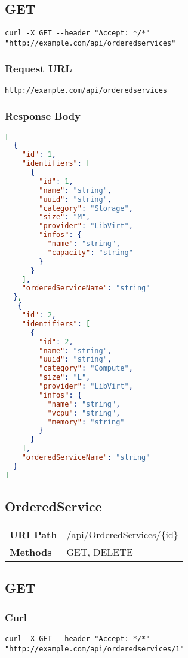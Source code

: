 \subsection{GET}
\begin{lstlisting}[style=Bash] 
curl -X GET --header "Accept: */*" "http://example.com/api/orderedservices"
\end{lstlisting}

\subsubsection{Request URL}
\begin{lstlisting}[] 
http://example.com/api/orderedservices
\end{lstlisting}

\subsubsection{Response Body}
\begin{lstlisting}[language=json] 
[
  {
    "id": 1,
    "identifiers": [
      {
        "id": 1,
        "name": "string",
        "uuid": "string",
        "category": "Storage",
        "size": "M",
        "provider": "LibVirt",
        "infos": {
          "name": "string",
          "capacity": "string"
        }
      }
    ],
    "orderedServiceName": "string"
  },
   {
    "id": 2,
    "identifiers": [
      {
        "id": 2,
        "name": "string",
        "uuid": "string",
        "category": "Compute",
        "size": "L",
        "provider": "LibVirt",
        "infos": {
          "name": "string",
          "vcpu": "string",
          "memory": "string"
        }
      }
    ],
    "orderedServiceName": "string"
  }
]
\end{lstlisting}

\subsection{OrderedService}
\begin{tabularx}{\linewidth}{l l}
\textbf{URI Path} & /api/OrderedServices/\{id\}\\
\textbf{Methods} & GET, DELETE\\
\end{tabularx}
\newpage
\subsection{GET}
\subsubsection{Curl}
\begin{lstlisting}[] 
curl -X GET --header "Accept: */*" "http://example.com/api/orderedservices/1"
\end{lstlisting}

